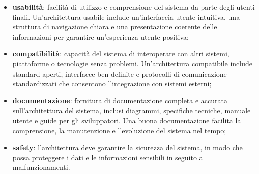\begin{itemize}
	\item \textbf{usabilità}: facilità di utilizzo e comprensione del sistema da parte degli utenti finali. Un'architettura usabile include un'interfaccia utente intuitiva, una struttura di navigazione chiara e una presentazione coerente delle informazioni per garantire un'esperienza utente positiva;
	\item \textbf{compatibilità}: capacità del sistema di interoperare con altri sistemi, piattaforme o tecnologie senza problemi. Un'architettura compatibile include standard aperti, interfacce ben definite e protocolli di comunicazione standardizzati che consentono l'integrazione con sistemi esterni;
	\item \textbf{documentazione}: fornitura di documentazione completa e accurata sull'architettura del sistema, inclusi diagrammi, specifiche tecniche, manuale utente e guide per gli sviluppatori. Una buona documentazione facilita la comprensione, la manutenzione e l'evoluzione del sistema nel tempo;
	\item \textbf{safety}: l'architettura deve garantire la sicurezza del sistema, in modo che possa proteggere i dati e le informazioni sensibili in seguito a malfunzionamenti.
\end{itemize}

